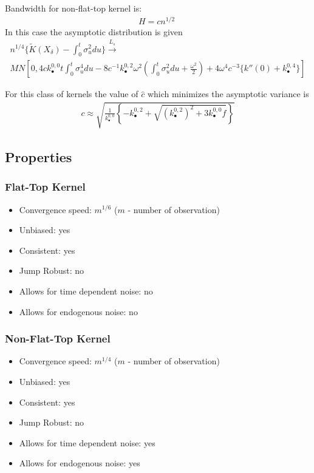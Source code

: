 \documentclass[letterpaper]{report}
\newcounter{N}
\begin{document}
\noindent Bandwidth for non-flat-top kernel is:
\begin{gather}
H = cn^{1/2}\;
\end{gather}
\noindent In this case the asymptotic distribution is given
\begin{gather}
n^{1/4}\{\tilde{K}(X_\delta) - \int_0^t \sigma_u^2 du\}
\stackrel{L_s}{\to}\nonumber\\
MN\left[0,4c k_{\bullet}^{0,0} t \int_0^t \sigma_u^4 du - 8 c^{-1} k_{\bullet}^{0,2}\omega^2 \left(\int_0^t \sigma_u^2 du + \frac{\omega^2}{2}\right) + 4\omega^4c^{-3}\{k''(0) + k_{\bullet}^{0,4}\} \right]
\end{gather}

\noindent For this class of kernels the value of $\hat{c}$ which minimizes the asymptotic variance is
\begin{gather}
c \approx \sqrt{\frac{1}{k_{\bullet}^{0,0}} \left\{-k_{\bullet}^{0,2} + \sqrt{(k_{\bullet}^{0,2})^2 + 3 k_{\bullet}^{0,0} f} \right\}}
\end{gather}
\subsection{Properties}
\subsubsection{Flat-Top Kernel}
\begin{itemize}
\item Convergence speed: $m^{1/6}$ ($m$ - number of observation)
\item Unbiased: yes
\item Consistent: yes
\item Jump Robust: no
\item Allows for time dependent noise: no
\item Allows for endogenous noise: no
\end{itemize}
\subsubsection{Non-Flat-Top Kernel}
\begin{itemize}
\item Convergence speed: $m^{1/4}$ ($m$ - number of observation)
\item Unbiased: yes
\item Consistent: yes
\item Jump Robust: no
\item Allows for time dependent noise: yes
\item Allows for endogenous noise: yes
\end{itemize}
\end{document}
